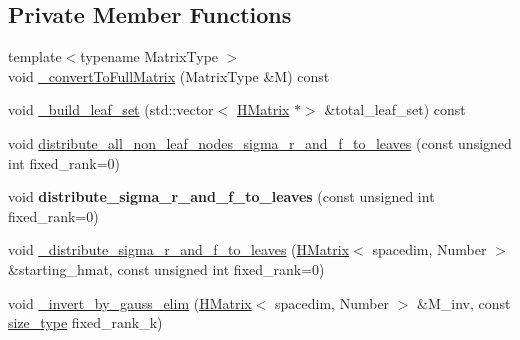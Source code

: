 \subsection*{Private Member Functions}
\begin{DoxyCompactItemize}
\item 
{\footnotesize template$<$typename Matrix\+Type $>$ }\\void \hyperlink{classHMatrix_ab55b568236ffdd71b5378ac6c6ace50a}{\+\_\+convert\+To\+Full\+Matrix} (Matrix\+Type \&M) const
\item 
void \hyperlink{classHMatrix_a60934e84cc3c9f6c75d011a2005f512a}{\+\_\+build\+\_\+leaf\+\_\+set} (std\+::vector$<$ \hyperlink{classHMatrix}{H\+Matrix} $\ast$$>$ \&total\+\_\+leaf\+\_\+set) const
\item 
void \hyperlink{classHMatrix_a66979dbdf56155c63f0706649e8545b9}{distribute\+\_\+all\+\_\+non\+\_\+leaf\+\_\+nodes\+\_\+sigma\+\_\+r\+\_\+and\+\_\+f\+\_\+to\+\_\+leaves} (const unsigned int fixed\+\_\+rank=0)
\item 
\mbox{\label{classHMatrix_a39e24569fe32027c840b160f9dcd1ad7}} 
void {\bfseries distribute\+\_\+sigma\+\_\+r\+\_\+and\+\_\+f\+\_\+to\+\_\+leaves} (const unsigned int fixed\+\_\+rank=0)
\item 
void \hyperlink{classHMatrix_a187e0c009a7c28679df7e92e0b01929c}{\+\_\+distribute\+\_\+sigma\+\_\+r\+\_\+and\+\_\+f\+\_\+to\+\_\+leaves} (\hyperlink{classHMatrix}{H\+Matrix}$<$ spacedim, Number $>$ \&starting\+\_\+hmat, const unsigned int fixed\+\_\+rank=0)
\item 
void \hyperlink{classHMatrix_af74e3b0c19e9178cfe699a6620a51170}{\+\_\+invert\+\_\+by\+\_\+gauss\+\_\+elim} (\hyperlink{classHMatrix}{H\+Matrix}$<$ spacedim, Number $>$ \&M\+\_\+inv, const \hyperlink{classHMatrix_a5ca8dc549783d38371a01ecd621ecb34}{size\+\_\+type} fixed\+\_\+rank\+\_\+k)
\end{DoxyCompactItemize}
